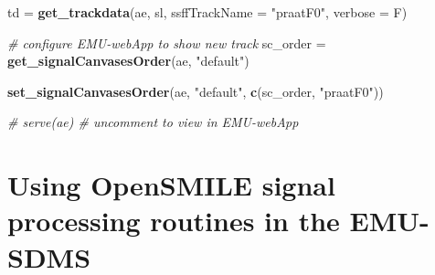 \documentclass[]{book}
\newenvironment{Shaded}{\begin{snugshade}}{\end{snugshade}}
\newcommand{\CommentTok}[1]{\textcolor[rgb]{0.56,0.35,0.01}{\textit{#1}}}
\newcommand{\DataTypeTok}[1]{\textcolor[rgb]{0.13,0.29,0.53}{#1}}
\newcommand{\KeywordTok}[1]{\textcolor[rgb]{0.13,0.29,0.53}{\textbf{#1}}}
\newcommand{\NormalTok}[1]{#1}
\newcommand{\StringTok}[1]{\textcolor[rgb]{0.31,0.60,0.02}{#1}}
\begin{document}
\begin{Shaded}
\begin{Highlighting}[]
\NormalTok{td =}\StringTok{ }\KeywordTok{get_trackdata}\NormalTok{(ae, sl, }\DataTypeTok{ssffTrackName =} \StringTok{"praatF0"}\NormalTok{, }\DataTypeTok{verbose =}\NormalTok{ F)}

\CommentTok{# configure EMU-webApp to show new track}
\NormalTok{sc_order =}\StringTok{ }\KeywordTok{get_signalCanvasesOrder}\NormalTok{(ae, }\StringTok{"default"}\NormalTok{)}

\KeywordTok{set_signalCanvasesOrder}\NormalTok{(ae, }\StringTok{"default"}\NormalTok{, }\KeywordTok{c}\NormalTok{(sc_order, }\StringTok{"praatF0"}\NormalTok{))}

\CommentTok{# serve(ae) # uncomment to view in EMU-webApp}
\end{Highlighting}
\end{Shaded}

\hypertarget{sec:app-chap-wrassp-opensmileSigProc}{%
\section{Using OpenSMILE signal processing routines in the EMU-SDMS}\label{sec:app-chap-wrassp-opensmileSigProc}}
\end{document}
